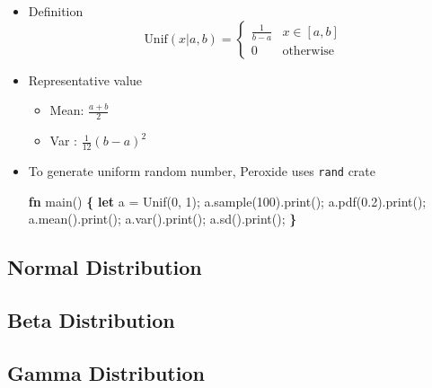 \documentclass[]{book}
\newenvironment{Shaded}{\begin{snugshade}}{\end{snugshade}}
\newcommand{\DecValTok}[1]{\textcolor[rgb]{0.00,0.00,0.81}{#1}}
\newcommand{\KeywordTok}[1]{\textcolor[rgb]{0.13,0.29,0.53}{\textbf{#1}}}
\newcommand{\NormalTok}[1]{#1}
\newcommand{\OperatorTok}[1]{\textcolor[rgb]{0.81,0.36,0.00}{\textbf{#1}}}
\providecommand{\tightlist}{%
  \setlength{\itemsep}{0pt}\setlength{\parskip}{0pt}}
\begin{document}
\begin{itemize}
\item
  Definition
  \[\text{Unif}(x | a, b) = \begin{cases}
     \frac{1}{b - a} & x \in [a,b]\\
     0 & \text{otherwise}
    \end{cases}\]
\item
  Representative value

  \begin{itemize}
  \tightlist
  \item
    Mean: \(\frac{a + b}{2}\)
  \item
    Var : \(\frac{1}{12}(b-a)^2\)
  \end{itemize}
\item
  To generate uniform random number, Peroxide uses \texttt{rand} crate

\begin{Shaded}
\begin{Highlighting}[]
\KeywordTok{fn}\NormalTok{ main() }\OperatorTok{\{}
    \KeywordTok{let}\NormalTok{ a = Unif(}\DecValTok{0}\NormalTok{, }\DecValTok{1}\NormalTok{);}
\NormalTok{    a.sample(}\DecValTok{100}\NormalTok{).print();}
\NormalTok{    a.pdf(}\DecValTok{0.2}\NormalTok{).print();}
\NormalTok{    a.mean().print();}
\NormalTok{    a.var().print();}
\NormalTok{    a.sd().print();}
\OperatorTok{\}}
\end{Highlighting}
\end{Shaded}
\end{itemize}

\hypertarget{normal-distribution}{%
\subsection{Normal Distribution}\label{normal-distribution}}

\hypertarget{beta-distribution}{%
\subsection{Beta Distribution}\label{beta-distribution}}

\hypertarget{gamma-distribution}{%
\subsection{Gamma Distribution}\label{gamma-distribution}}


\end{document}
